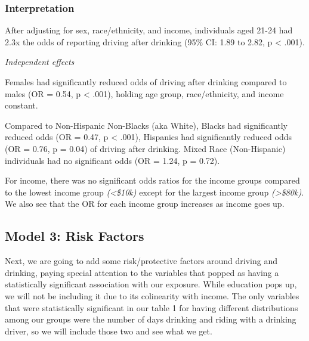 \documentclass[
]{article}
\begin{document}
\subsubsection{Interpretation}\label{interpretation-1}

After adjusting for sex, race/ethnicity, and income, individuals aged
21-24 had 2.3x the odds of reporting driving after drinking (95\% CI:
1.89 to 2.82, p \textless{} .001).

\emph{Independent effects}

Females had significantly reduced odds of driving after drinking
compared to males (OR = 0.54, p \textless{} .001), holding age group,
race/ethnicity, and income constant.

Compared to Non-Hispanic Non-Blacks (aka White), Blacks had
significantly reduced odds (OR = 0.47, p \textless{} .001), Hispanics
had significantly reduced odds (OR = 0.76, p = 0.04) of driving after
drinking. Mixed Race (Non-Hispanic) individuals had no significant odds
(OR = 1.24, p = 0.72).

For income, there was no significant odds ratios for the income groups
compared to the lowest income group \emph{(\textless\$10k)} except for
the largest income group \emph{(\textgreater\$80k)}. We also see that
the OR for each income group increases as income goes up.

\subsection{Model 3: Risk Factors}\label{model-3-risk-factors}

Next, we are going to add some risk/protective factors around driving
and drinking, paying special attention to the variables that popped as
having a statistically significant association with our exposure. While
education pops up, we will not be including it due to its colinearity
with income. The only variables that were statistically significant in
our table 1 for having different distributions among our groups were the
number of days drinking and riding with a drinking driver, so we will
include those two and see what we get.
\end{document}
